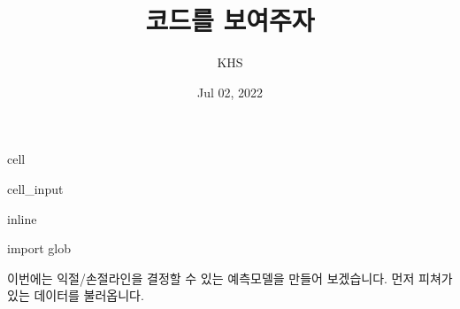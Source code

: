 \documentclass[letterpaper,10pt,english]{jupyterBook}
\title{코드를 보여주자}
\date{Jul 02, 2022}
\author{KHS}
\begin{document}
\pagestyle{empty}
\sphinxmaketitle
\pagestyle{plain}
\sphinxtableofcontents
\pagestyle{normal}
\label{\detokenize{chapter1/test::doc}}


\begin{sphinxuseclass}{cell}\begin{sphinxVerbatimInput}

\begin{sphinxuseclass}{cell_input}
\begin{sphinxVerbatim}[commandchars=\\\{\}]
   
   
 inline
   
   
 
 
\end{sphinxVerbatim}

\end{sphinxuseclass}\end{sphinxVerbatimInput}

\end{sphinxuseclass}
\sphinxAtStartPar
import glob

\sphinxAtStartPar
 이번에는 익절/손절라인을 결정할 수 있는 예측모델을 만들어 보겠습니다. 먼저 피쳐가 있는 데이터를 불러옵니다.
\end{document}
